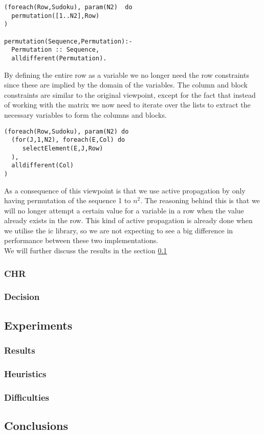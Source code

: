 \begin{lstlisting}
(foreach(Row,Sudoku), param(N2)  do
  permutation([1..N2],Row)
)

permutation(Sequence,Permutation):-
  Permutation :: Sequence,
  alldifferent(Permutation).
\end{lstlisting}

By defining the entire row as a variable we no longer need the row constraints since these are implied by the domain of the variables.
The column and block constraints are similar to the original viewpoint, except for the fact that instead of working with the matrix we now need to iterate over the lists to extract the necessary variables to form the columns and blocks.

\begin{lstlisting}
(foreach(Row,Sudoku), param(N2) do
  (for(J,1,N2), foreach(E,Col) do
     selectElement(E,J,Row)
  ),
  alldifferent(Col)
)
\end{lstlisting}

As a consequence of this viewpoint is that we use active propagation by only having permutation of the sequence 1 to $n^2$.
The reasoning behind this is that we will no longer attempt a certain value for a variable in a row when the value already exists in the row. 
This kind of active propagation is already done when we utilise the ic library, so we are not expecting to see a big difference in performance between these two implementations.\\

We will further discuss the results in the section \ref{subsec:sudokuexperiments}

\subsubsection{CHR}
\subsubsection{Decision}


\subsection{Experiments}\label{subsec:sudokuexperiments}
\subsubsection{Results}
\subsubsection{Heuristics}
\subsubsection{Difficulties}

\subsection{Conclusions}


